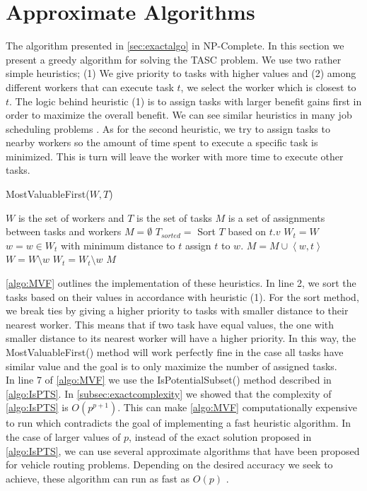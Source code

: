 \section{Approximate Algorithms}
\label{sec:approxalgo}

The algorithm presented in \cref{sec:exactalgo} in NP-Complete. In this section we present a greedy algorithm for solving the TASC problem. We use two rather simple heuristics; (1) We give priority to tasks with higher values and (2) among different workers that can execute task $t$, we select the worker which is closest to $t$. The logic behind heuristic (1) is to assign tasks with larger benefit gains first in order to maximize the overall benefit. We can see similar heuristics in many job scheduling problems \cite{Kolen07}. As for the second heuristic, we try to assign tasks to nearby workers so the amount of time spent to execute a specific task is minimized. This is turn will leave the worker with more time to execute other tasks.

\begin{algorithm}[h]
\caption{MostValuableFirst($W, T$)}
\label{algo:MVF}
\begin{algorithmic}[1]
\REQUIRE $W$ is the set of workers and $T$ is the set of tasks
\ENSURE $M$ is a set of assignments between tasks and workers
\STATE $M = \emptyset$
\STATE $T_{sorted} = $ Sort $T$ based on $t.v$
	\STATE $W_t = W$
		\STATE $w = w \in W_t$ with minimum distance to $t$
			\STATE assign $t$ to $w$.
			\STATE $M = M \cup \left\langle w, t \right\rangle$
				\STATE $W = W \setminus w$
			\ENDIF
		\ELSE
			\STATE $W_t = W_t \setminus w$
		\ENDIF
	\ENDWHILE
\ENDWHILE
\RETURN $M$
\end{algorithmic}
\end{algorithm}

\cref{algo:MVF} outlines the implementation of these heuristics. In line 2, we sort the tasks based on their values in accordance with heuristic (1). For the sort method, we break ties by giving a higher priority to tasks with smaller distance to their nearest worker. This means that if two task have equal values, the one with smaller distance to its nearest worker will have a higher priority. In this way, the MostValuableFirst() method will work perfectly fine in the case all tasks have similar value and the goal is to only maximize the number of assigned tasks.\\

In line 7 of \cref{algo:MVF} we use the IsPotentialSubset() method described in \cref{algo:IsPTS}. In \cref{subsec:exactcomplexity} we showed that the complexity of \cref{algo:IsPTS} is $O(p^{p+1})$. This can make \cref{algo:MVF} computationally expensive to run which contradicts the goal of implementing a fast heuristic algorithm. In the case of larger values of $p$, instead of the exact solution proposed in \cref{algo:IsPTS}, we can use several approximate algorithms that have been proposed for vehicle routing problems. Depending on the desired accuracy we seek to achieve, these algorithm can run as fast as $O(p)$ \cite{Laporte00}.
